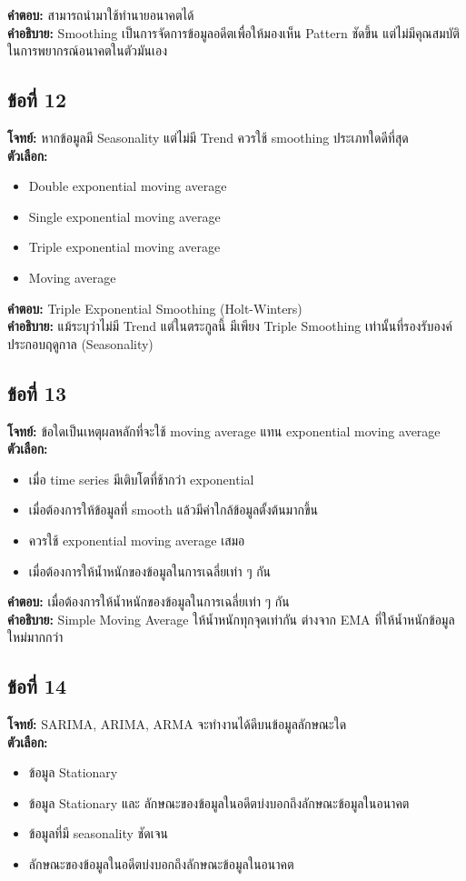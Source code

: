 \documentclass[12pt]{article}
\begin{document}
\textbf{คำตอบ:} สามารถนำมาใช้ทำนายอนาคตได้\\
\textbf{คำอธิบาย:} Smoothing เป็นการจัดการข้อมูลอดีตเพื่อให้มองเห็น Pattern ชัดขึ้น แต่ไม่มีคุณสมบัติในการพยากรณ์อนาคตในตัวมันเอง

\subsection*{ข้อที่ 12}
\textbf{โจทย์:} หากข้อมูลมี Seasonality แต่ไม่มี Trend ควรใช้ smoothing ประเภทใดดีที่สุด\\
\textbf{ตัวเลือก:}
\begin{itemize}
    \item Double exponential moving average
    \item Single exponential moving average
    \item Triple exponential moving average
    \item Moving average
\end{itemize}

\textbf{คำตอบ:} Triple Exponential Smoothing (Holt-Winters)\\
\textbf{คำอธิบาย:} แม้ระบุว่าไม่มี Trend แต่ในตระกูลนี้ มีเพียง Triple Smoothing เท่านั้นที่รองรับองค์ประกอบฤดูกาล (Seasonality)

\subsection*{ข้อที่ 13}
\textbf{โจทย์:} ข้อใดเป็นเหตุผลหลักที่จะใช้ moving average แทน exponential moving average\\
\textbf{ตัวเลือก:}
\begin{itemize}
    \item เมื่อ time series มีเติบโตที่ช้ากว่า exponential
    \item เมื่อต้องการให้ข้อมูลที่ smooth แล้วมีค่าใกล้ข้อมูลตั้งต้นมากขึ้น
    \item ควรใช้ exponential moving average เสมอ
    \item เมื่อต้องการให้น้ำหนักของข้อมูลในการเฉลี่ยเท่า ๆ กัน
\end{itemize}

\textbf{คำตอบ:} เมื่อต้องการให้น้ำหนักของข้อมูลในการเฉลี่ยเท่า ๆ กัน\\
\textbf{คำอธิบาย:} Simple Moving Average ให้น้ำหนักทุกจุดเท่ากัน ต่างจาก EMA ที่ให้น้ำหนักข้อมูลใหม่มากกว่า

\subsection*{ข้อที่ 14}
\textbf{โจทย์:} SARIMA, ARIMA, ARMA จะทำงานได้ดีบนข้อมูลลักษณะใด\\
\textbf{ตัวเลือก:}
\begin{itemize}
    \item ข้อมูล Stationary
    \item ข้อมูล Stationary และ ลักษณะของข้อมูลในอดีตบ่งบอกถึงลักษณะข้อมูลในอนาคต
    \item ข้อมูลที่มี seasonality ชัดเจน
    \item ลักษณะของข้อมูลในอดีตบ่งบอกถึงลักษณะข้อมูลในอนาคต
\end{itemize}
\end{document}

